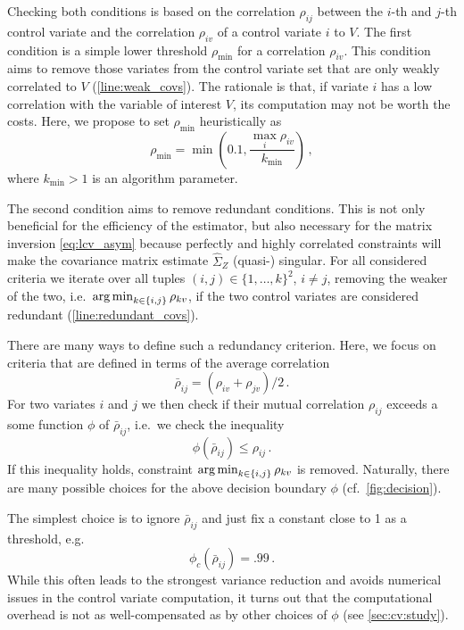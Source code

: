 Checking both conditions is based on the correlation $\rho_{ij}$ between the $i$-th and $j$-th control variate
and the correlation $\rho_{iv}$ of a control variate $i$ to $V$.
The first condition is a simple lower threshold $\rho_{\min}$ for a correlation $\rho_{iv}$.
This condition aims to remove those variates  from the control  variate set that are only weakly correlated to $V$ (\autoref{line:weak_covs}).
The rationale is that, if variate $i$ has a low correlation with the variable of interest $V$,
its computation may not be worth the costs.
Here, we propose to set $\rho_{\min}$ heuristically as
$$\rho_{\min} = \min\left(0.1, \frac{\max_{i}\rho_{iv}}{k_{\min}}\right)\,,$$
where $k_{\min}>1$ is an algorithm parameter.

The second condition aims to remove redundant conditions.
This is not only beneficial for the efficiency of the estimator, but also 
necessary for the matrix inversion \eqref{eq:lcv_asym}
because perfectly and highly correlated constraints will make
the covariance matrix estimate $\hat{\Sigma}_Z$ (quasi-) singular.
For all considered criteria we iterate over all tuples $(i,j)\in \{1,\dots,k\}^2$, $i\neq j$,
removing the weaker of the two, i.e.\ $\operatorname*{arg\,min}_{k\in\{i,j\}}\rho_{kv}$,
if the two control  variates are considered redundant (\autoref{line:redundant_covs}).

There are many ways to define such a redundancy criterion.
Here, we focus on criteria that are defined in terms of the
average correlation $$\bar\rho_{ij}=(\rho_{iv} + \rho_{jv})/2\,.$$
For two variates $i$ and $j$ we then check if their mutual correlation
$\rho_{ij}$ exceeds a some function $\phi$ of ${\bar{\rho}}_{ij}$,
i.e.\ we check the inequality
$$\phi(\bar\rho_{ij}) \leq \rho_{ij}\,.$$
If this inequality holds, constraint $\operatorname*{arg\,min}_{k\in\{i,j\}}\rho_{kv}$ is removed.
Naturally, there are many possible choices for the above decision boundary $\phi$ (cf.\ \autoref{fig:decision}).


The simplest choice is to ignore $\bar\rho_{ij}$ and just fix a constant close to 1 as a threshold,
e.g.\ $$ \phi_c(\bar\rho_{ij})=.99\,.$$ While this often leads to the strongest variance reduction
and avoids numerical issues in the control variate computation, it turns out
that the computational overhead is not as well-compensated as by other choices of $\phi$ (see \autoref{sec:cv:study}).

